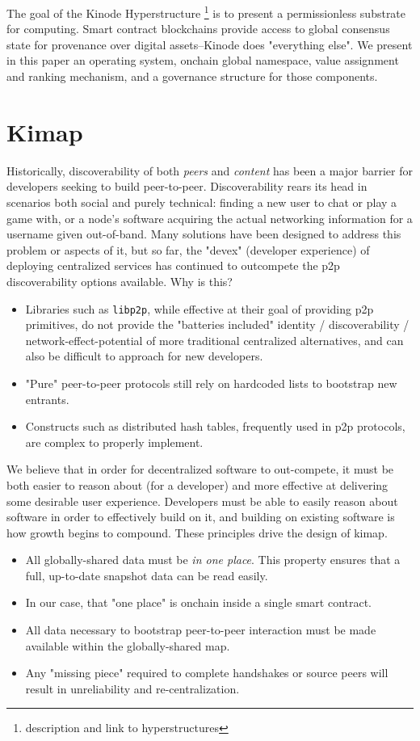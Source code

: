 \documentclass[runningheads]{llncs}
\begin{document}
The goal of the Kinode Hyperstructure
\footnote{description and link to hyperstructures}
is to present a permissionless substrate for computing.
Smart contract blockchains provide access to global consensus state for provenance over digital assets–Kinode does "everything else".
We present in this paper an operating system, onchain global namespace, value assignment and ranking mechanism, and a governance structure for those components.

\section{Kimap}

Historically, discoverability of both \textit{peers} and \textit{content} has been a major barrier for developers seeking to build peer-to-peer.
Discoverability rears its head in scenarios both social and purely technical: finding a new user to chat or play a game with, or a node's software acquiring the actual networking information for a username given out-of-band.
Many solutions have been designed to address this problem or aspects of it, but so far, the "devex" (developer experience) of deploying centralized services has continued to outcompete the p2p discoverability options available.
Why is this?
\begin{itemize}
    \item Libraries such as \verb|libp2p|, while effective at their goal of providing p2p primitives, do not provide the "batteries included" identity / discoverability / network-effect-potential of more traditional centralized alternatives, and can also be difficult to approach for new developers.
    \item "Pure" peer-to-peer protocols still rely on hardcoded lists to bootstrap new entrants.
    \item Constructs such as distributed hash tables, frequently used in p2p protocols, are complex to properly implement.
\end{itemize}
We believe that in order for decentralized software to out-compete, it must be both easier to reason about (for a developer) and more effective at delivering some desirable user experience.
Developers must be able to easily reason about software in order to effectively build on it, and building on existing software is how growth begins to compound.
These principles drive the design of kimap.
\begin{itemize}
    \item All globally-shared data must be \textit{in one place}.
    This property ensures that a full, up-to-date snapshot data can be read easily.
    \item In our case, that "one place" is onchain inside a single smart contract.
    \item All data necessary to bootstrap peer-to-peer interaction must be made available within the globally-shared map.
    \item Any "missing piece" required to complete handshakes or source peers will result in unreliability and re-centralization.
\end{itemize}
\end{document}
